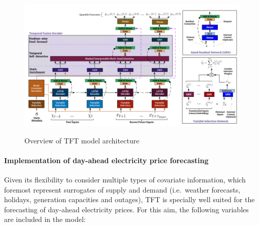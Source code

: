 \documentclass[a4paper]{article}
\begin{document}
    \begin{figure}
\centering
{\includegraphics[keepaspectratio]{src/tft.png}}
\caption{Overview of TFT model architecture}
\end{figure}

    \paragraph{Implementation of day-ahead electricity price
forecasting}\label{implementation-of-day-ahead-electricity-price-forecasting}

Given its flexibility to consider multiple types of covariate
information, which foremost represent surrogates of supply and demand
(i.e.~weather forecasts, holidays, generation capacities and outages),
TFT is specially well suited for the forecasting of day-ahead
electricity prices. For this aim, the following variables are included
in the model:
\end{document}
